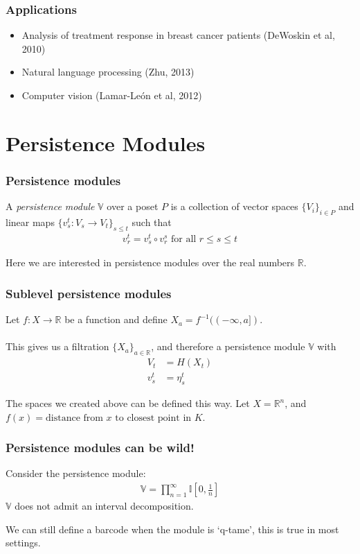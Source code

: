 \documentclass[11pt]{beamer}
\begin{document}
\begin{frame}
\frametitle{Applications}
\begin{itemize}
\item Analysis of treatment response in breast cancer patients (DeWoskin et al, 2010)
\item Natural language processing (Zhu, 2013)
\item Computer vision (Lamar-Le\'{o}n et al, 2012)
\end{itemize}
\end{frame}

\section{Persistence Modules}

\begin{frame}
\frametitle{Persistence modules}
\begin{definition}
A \emph{persistence module} $\mathbb{V}$ over a poset $P$ is a collection of vector spaces $\{V_i\}_{i \in P}$ and linear maps $\{v_s^t : V_s \to V_t\}_{s \leq t}$ such that
\begin{align*}
v_r^t = v_s^t \circ v_r^s \text{ for all } r \leq s \leq t
\end{align*}
\end{definition}
Here we are interested in persistence modules over the real numbers $\mathbb{R}$.
\end{frame}

\begin{frame}
\frametitle{Sublevel persistence modules}
Let $f : X \to \mathbb{R}$ be a function and define $X_a = f^{-1}((-\infty, a])$.
\\~\\
This gives us a filtration $\{X_a\}_{a \in \mathbb{R}}$, and therefore a persistence module $\mathbb{V}$ with
\begin{align*}
V_t &= H(X_t)\\
v_s^t &= \eta_s^t
\end{align*}

The spaces we created above can be defined this way. Let $X = \mathbb{R}^n$, and $f(x) = \text{distance from $x$ to closest point in $K$}$.
\end{frame}

\begin{frame}
\frametitle{Persistence modules can be wild!}
\begin{example}
Consider the persistence module:
\begin{align*}
\mathbb{V} = \prod_{n=1}^\infty \mathbb{I}[0, \tfrac{1}{n}]
\end{align*}
$\mathbb{V}$ does not admit an interval decomposition.
\end{example}

We can still define a barcode when the module is `q-tame', this is true in most settings.
\end{frame}
\end{document}
